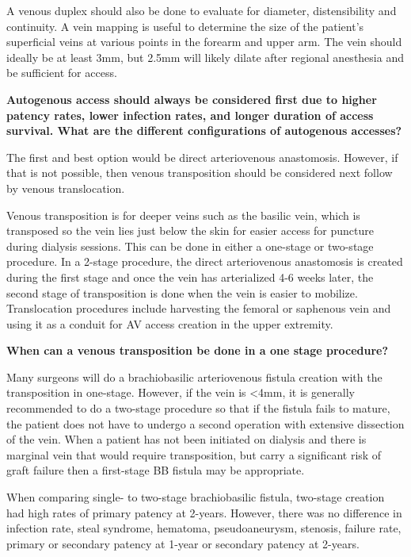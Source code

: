 \documentclass[
]{book}
\begin{document}
A venous duplex should also be done to evaluate for diameter,
distensibility and continuity. A vein mapping is useful to determine the
size of the patient's superficial veins at various points in the forearm
and upper arm. The vein should ideally be at least 3mm, but 2.5mm will
likely dilate after regional anesthesia and be sufficient for
access.\citep{huber2002, smith2012}

\textbf{Autogenous access should always be considered first due to higher
patency rates, lower infection rates, and longer duration of access
survival. What are the different configurations of autogenous
accesses?}

The first and best option would be direct arteriovenous anastomosis.
However, if that is not possible, then venous transposition should be
considered next follow by venous translocation.

Venous transposition is for deeper veins such as the basilic vein, which
is transposed so the vein lies just below the skin for easier access for
puncture during dialysis sessions. This can be done in either a
one-stage or two-stage procedure. In a 2-stage procedure, the direct
arteriovenous anastomosis is created during the first stage and once the
vein has arterialized 4-6 weeks later, the second stage of transposition
is done when the vein is easier to mobilize. Translocation procedures
include harvesting the femoral or saphenous vein and using it as a
conduit for AV access creation in the upper extremity.

\textbf{When can a venous transposition be done in a one stage procedure?}

Many surgeons will do a brachiobasilic arteriovenous fistula creation
with the transposition in one-stage. However, if the vein is \textless4mm, it
is generally recommended to do a two-stage procedure so that if the
fistula fails to mature, the patient does not have to undergo a second
operation with extensive dissection of the vein. When a patient has not
been initiated on dialysis and there is marginal vein that would require
transposition, but carry a significant risk of graft failure then a
first-stage BB fistula may be appropriate.

When comparing single- to two-stage brachiobasilic fistula, two-stage
creation had high rates of primary patency at 2-years. However, there
was no difference in infection rate, steal syndrome, hematoma,
pseudoaneurysm, stenosis, failure rate, primary or secondary patency at
1-year or secondary patency at 2-years.\citep{junyanwee2018}
\end{document}
